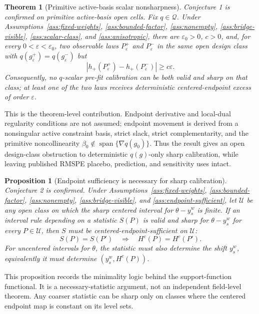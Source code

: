 \documentclass[11pt]{article}
\theoremstyle{definition}
\theoremstyle{plain}
\newtheorem{theorem}{Theorem}
\newtheorem{proposition}{Proposition}
\theoremstyle{remark}
\begin{document}
\begin{theorem}[Primitive active-basis scalar nonsharpness]\label{thm:generic-scalar}
Conjecture 1 is confirmed on primitive active-basis open cells.  Fix
\(q\in\mathcal Q\).  Under
Assumptions~\ref{ass:fixed-weights}, \ref{ass:bounded-factor},
\ref{ass:nonempty}, \ref{ass:bridge-visible}, \ref{ass:scalar-class}, and
\ref{ass:anisotropic}, there are \(\varepsilon_0>0\), \(c>0\), and, for every
\(0<\varepsilon<\varepsilon_0\), two observable laws \(P_\varepsilon^+\) and
\(P_\varepsilon^-\) in the same open design class with
\(q(g_\varepsilon^+)=q(g_\varepsilon^-)\) but
\[
\left|h_+(P_\varepsilon^+)-h_+(P_\varepsilon^-)\right|\ge c\varepsilon .
\]
Consequently, no \(q\)-scalar pre-fit calibration can be both valid and sharp
on that class; at least one of the two laws receives deterministic
centered-endpoint excess of order \(\varepsilon\).
\end{theorem}
This is the theorem-level contribution.  Endpoint derivative and local-dual
regularity conditions are not assumed; endpoint movement is derived from a
nonsingular active constraint basis, strict slack, strict complementarity, and
the primitive noncollinearity
\(\beta_0\notin\operatorname{span}\{\nabla q(g_0)\}\).  Thus the result gives
an open design-class obstruction to deterministic \(q(g)\)-only sharp
calibration, while leaving published RMSPE placebo, prediction, and sensitivity
uses intact.

\begin{proposition}[Endpoint sufficiency is necessary for sharp calibration]\label{thm:endpoint-sufficiency}
Conjecture 2 is confirmed.  Under Assumptions~\ref{ass:fixed-weights},
\ref{ass:bounded-factor}, \ref{ass:nonempty}, \ref{ass:bridge-visible}, and
\ref{ass:endpoint-sufficient}, let \(\mathcal U\) be any open class on which
the sharp centered interval for \(\theta-y_s^w\) is finite.  If an interval
rule depending on a statistic \(S(P)\) is valid and sharp for
\(\theta-y_s^w\) for every \(P\in\mathcal U\), then \(S\) must be
centered-endpoint-sufficient on \(\mathcal U\):
\[
S(P)=S(P')\quad\Longrightarrow\quad H^c(P)=H^c(P') .
\]
For uncentered intervals for \(\theta\), the statistic must also determine the
shift \(y_s^w\), equivalently it must determine \((y_s^w,H^c(P))\).
\end{proposition}
This proposition records the minimality logic behind the support-function
functional.  It is a necessary-statistic argument, not an independent
field-level theorem.  Any coarser statistic can be sharp only on classes where
the centered endpoint map is constant on its level sets.
\end{document}
